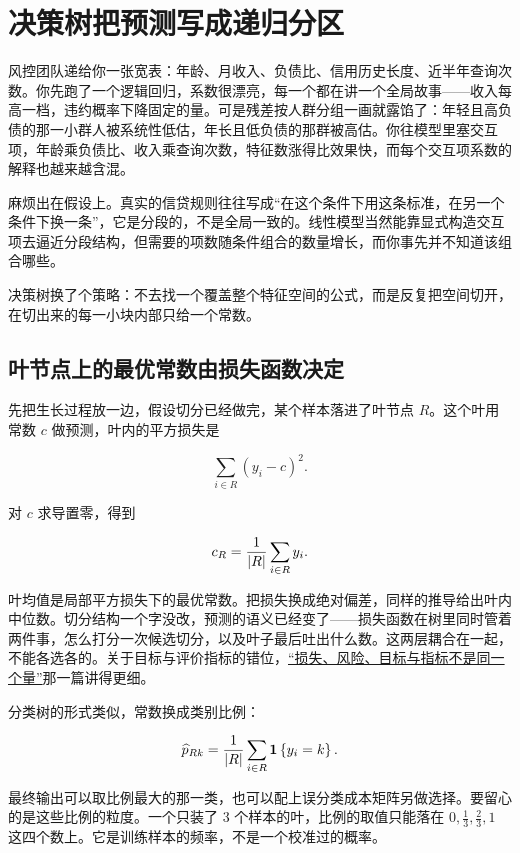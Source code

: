 \section{决策树把预测写成递归分区}
\label{sec:13-Machine-Learning/03-Trees-Ensembles-and-Neighbors/01}

风控团队递给你一张宽表：年龄、月收入、负债比、信用历史长度、近半年查询次数。你先跑了一个逻辑回归，系数很漂亮，每一个都在讲一个全局故事——收入每高一档，违约概率下降固定的量。可是残差按人群分组一画就露馅了：年轻且高负债的那一小群人被系统性低估，年长且低负债的那群被高估。你往模型里塞交互项，年龄乘负债比、收入乘查询次数，特征数涨得比效果快，而每个交互项系数的解释也越来越含混。

麻烦出在假设上。真实的信贷规则往往写成``在这个条件下用这条标准，在另一个条件下换一条''，它是分段的，不是全局一致的。线性模型当然能靠显式构造交互项去逼近分段结构，但需要的项数随条件组合的数量增长，而你事先并不知道该组合哪些。

决策树换了个策略：不去找一个覆盖整个特征空间的公式，而是反复把空间切开，在切出来的每一小块内部只给一个常数。

\subsection{叶节点上的最优常数由损失函数决定}

先把生长过程放一边，假设切分已经做完，某个样本落进了叶节点 \(R\)。这个叶用常数 \(c\) 做预测，叶内的平方损失是

\[
\sum_{i\in R}(y_i-c)^2 .
\]

对 \(c\) 求导置零，得到

\[
c_R = \frac1{\left|R\right|}\sum_{i\in R}y_i .
\]

叶均值是局部平方损失下的最优常数。把损失换成绝对偏差，同样的推导给出叶内中位数。切分结构一个字没改，预测的语义已经变了——损失函数在树里同时管着两件事，怎么打分一次候选切分，以及叶子最后吐出什么数。这两层耦合在一起，不能各选各的。关于目标与评价指标的错位，\hyperref[sec:13-Machine-Learning/01-Learning-Problems-and-Evaluation/02]{``损失、风险、目标与指标不是同一个量''}那一篇讲得更细。

分类树的形式类似，常数换成类别比例：

\[
\widehat p_{Rk} = \frac1{\left|R\right|}\sum_{i\in R}\mathbf{1}\left\{y_i=k\right\}.
\]

最终输出可以取比例最大的那一类，也可以配上误分类成本矩阵另做选择。要留心的是这些比例的粒度。一个只装了 3 个样本的叶，比例的取值只能落在 \(0,\tfrac13,\tfrac23,1\) 这四个数上。它是训练样本的频率，不是一个校准过的概率。


